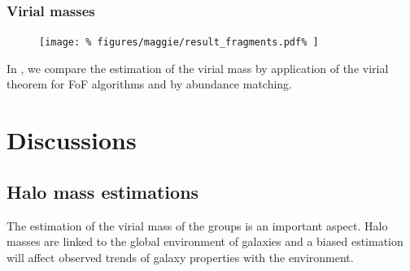 \subsubsection{Virial masses}
%
\begin{figure}[htb]
    \centering
    \begin{minipage}{0.49\linewidth}
        \texttt{[image: \%
            figures/maggie/result\_fragments.pdf\%
        ]}
    \end{minipage}
    \begin{minipage}{0.49\linewidth}
        \begin{minipage}{\linewidth}
        \end{minipage}
        \begin{minipage}{\linewidth}
        \end{minipage}
    \end{minipage}
\end{figure}

In , we compare the estimation of
the virial mass by application of the virial theorem for FoF algorithms and by
abundance matching.

\section{Discussions}
\label{sec:maggie_discussions}

\subsection{Halo mass estimations}
\label{sec:hmf_test}

The estimation of the virial mass of the groups is an important aspect. Halo
masses are linked to the global environment of galaxies and a biased
estimation will affect observed trends of galaxy properties with the
environment.

